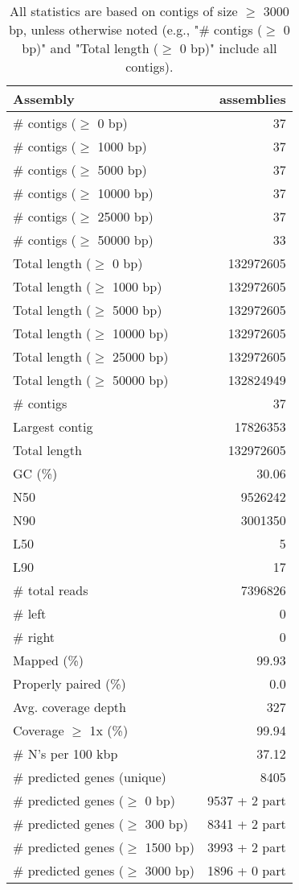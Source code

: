 \documentclass[12pt,a4paper]{article}
\begin{document}
\begin{table}[ht]
\begin{center}
\caption{All statistics are based on contigs of size $\geq$ 3000 bp, unless otherwise noted (e.g., "\# contigs ($\geq$ 0 bp)" and "Total length ($\geq$ 0 bp)" include all contigs).}
\begin{tabular}{|l*{1}{|r}|}
\hline
Assembly & assemblies \\ \hline
\# contigs ($\geq$ 0 bp) & 37 \\ \hline
\# contigs ($\geq$ 1000 bp) & 37 \\ \hline
\# contigs ($\geq$ 5000 bp) & 37 \\ \hline
\# contigs ($\geq$ 10000 bp) & 37 \\ \hline
\# contigs ($\geq$ 25000 bp) & 37 \\ \hline
\# contigs ($\geq$ 50000 bp) & 33 \\ \hline
Total length ($\geq$ 0 bp) & 132972605 \\ \hline
Total length ($\geq$ 1000 bp) & 132972605 \\ \hline
Total length ($\geq$ 5000 bp) & 132972605 \\ \hline
Total length ($\geq$ 10000 bp) & 132972605 \\ \hline
Total length ($\geq$ 25000 bp) & 132972605 \\ \hline
Total length ($\geq$ 50000 bp) & 132824949 \\ \hline
\# contigs & 37 \\ \hline
Largest contig & 17826353 \\ \hline
Total length & 132972605 \\ \hline
GC (\%) & 30.06 \\ \hline
N50 & 9526242 \\ \hline
N90 & 3001350 \\ \hline
L50 & 5 \\ \hline
L90 & 17 \\ \hline
\# total reads & 7396826 \\ \hline
\# left & 0 \\ \hline
\# right & 0 \\ \hline
Mapped (\%) & 99.93 \\ \hline
Properly paired (\%) & 0.0 \\ \hline
Avg. coverage depth & 327 \\ \hline
Coverage $\geq$ 1x (\%) & 99.94 \\ \hline
\# N's per 100 kbp & 37.12 \\ \hline
\# predicted genes (unique) & 8405 \\ \hline
\# predicted genes ($\geq$ 0 bp) & 9537 + 2 part \\ \hline
\# predicted genes ($\geq$ 300 bp) & 8341 + 2 part \\ \hline
\# predicted genes ($\geq$ 1500 bp) & 3993 + 2 part \\ \hline
\# predicted genes ($\geq$ 3000 bp) & 1896 + 0 part \\ \hline
\end{tabular}
\end{center}
\end{table}
\end{document}
